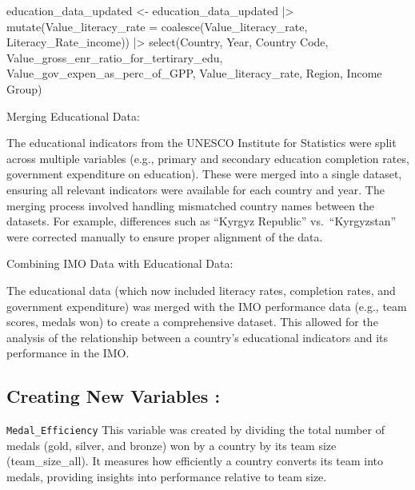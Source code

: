 \documentclass[
  letterpaper,
  DIV=11,
  numbers=noendperiod]{scrartcl}
\newenvironment{Shaded}{\begin{snugshade}}{\end{snugshade}}
\newcommand{\AttributeTok}[1]{\textcolor[rgb]{0.40,0.45,0.13}{#1}}
\newcommand{\FunctionTok}[1]{\textcolor[rgb]{0.28,0.35,0.67}{#1}}
\newcommand{\NormalTok}[1]{\textcolor[rgb]{0.00,0.23,0.31}{#1}}
\newcommand{\OtherTok}[1]{\textcolor[rgb]{0.00,0.23,0.31}{#1}}
\newcommand{\SpecialCharTok}[1]{\textcolor[rgb]{0.37,0.37,0.37}{#1}}
\newcommand{\StringTok}[1]{\textcolor[rgb]{0.13,0.47,0.30}{#1}}
\begin{document}
\begin{Shaded}
\begin{Highlighting}[]
\NormalTok{education\_data\_updated }\OtherTok{\textless{}{-}}\NormalTok{ education\_data\_updated }\SpecialCharTok{|\textgreater{}}
  \FunctionTok{mutate}\NormalTok{(}\AttributeTok{Value\_literacy\_rate =} \FunctionTok{coalesce}\NormalTok{(Value\_literacy\_rate, }
\NormalTok{                                        Literacy\_Rate\_income)) }\SpecialCharTok{|\textgreater{}}
  \FunctionTok{select}\NormalTok{(Country, }
\NormalTok{         Year, }
         \StringTok{\textasciigrave{}}\AttributeTok{Country Code}\StringTok{\textasciigrave{}}\NormalTok{, }
\NormalTok{         Value\_gross\_enr\_ratio\_for\_tertirary\_edu,}
\NormalTok{         Value\_gov\_expen\_as\_perc\_of\_GPP, }
\NormalTok{         Value\_literacy\_rate, }
\NormalTok{         Region, }
         \StringTok{\textasciigrave{}}\AttributeTok{Income Group}\StringTok{\textasciigrave{}}\NormalTok{)}
\end{Highlighting}
\end{Shaded}

Merging Educational Data:

The educational indicators from the UNESCO Institute for Statistics were
split across multiple variables (e.g., primary and secondary education
completion rates, government expenditure on education). These were
merged into a single dataset, ensuring all relevant indicators were
available for each country and year. The merging process involved
handling mismatched country names between the datasets. For example,
differences such as ``Kyrgyz Republic'' vs.~``Kyrgyzstan'' were
corrected manually to ensure proper alignment of the data.

Combining IMO Data with Educational Data:

The educational data (which now included literacy rates, completion
rates, and government expenditure) was merged with the IMO performance
data (e.g., team scores, medals won) to create a comprehensive dataset.
This allowed for the analysis of the relationship between a country's
educational indicators and its performance in the IMO.

\subsection{Creating New Variables :}\label{creating-new-variables}

\texttt{Medal\_Efficiency} This variable was created by dividing the
total number of medals (gold, silver, and bronze) won by a country by
its team size (team\_size\_all). It measures how efficiently a country
converts its team into medals, providing insights into performance
relative to team size.
\end{document}
